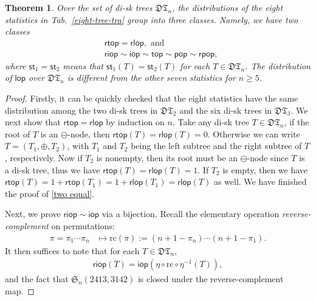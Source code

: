 \documentclass[12pt]{amsart}
\numberwithin{equation}{section}
\theoremstyle{plain}
\newtheorem{theorem}{Theorem}[section]
\theoremstyle{definition}
\def\S{\mathfrak{S}}
\def\st{\mathsf{st}}
\def\rc{\mathrm{rc}}
\newcommand{\DT}{\mathfrak{DT}}
\def\iop{\mathsf{iop}}
\def\top{\mathsf{top}}
\def\riop{\mathsf{riop}}
\def\rtop{\mathsf{rtop}}
\def\pop{\mathsf{pop}}
\def\lop{\mathsf{lop}}
\def\rpop{\mathsf{rpop}}
\def\rlop{\mathsf{rlop}}
\begin{document}
\begin{theorem}\label{thm:transver}
Over the set of di-sk trees $\DT_n$, the distributions of the eight statistics in Tab.~\ref{eight-tree-tra} group into three classes. Namely, we have two classes
\begin{align}
&\rtop=\rlop, \text{ and}\label{two equal}\\
&\riop\sim\iop\sim\top\sim\pop\sim\rpop, \label{five equal}
\end{align}
where $\st_1=\st_2$ means that $\st_1(T)=\st_2(T)$ for each $T\in\DT_n$. The distribution of $\lop$ over $\DT_n$ is different from the other seven statistics for $n\ge 5$.
\end{theorem}
\begin{proof}
Firstly, it can be quickly checked that the eight statistics have the same distribution among the two di-sk trees in $\DT_2$ and the six di-sk trees in $\DT_3$. We next show that $\rtop=\rlop$ by induction on $n$. Take any di-sk tree $T\in\DT_n$, if the root of $T$ is an $\ominus$-node, then $\rtop(T)=\rlop(T)=0$. Otherwise we can write $T=(T_1,\oplus,T_2)$, with $T_1$ and $T_2$ being the left subtree and the right subtree of $T$, respectively. Now if $T_2$ is nonempty, then its root must be an $\ominus$-node since $T$ is a di-sk tree, thus we have $\rtop(T)=\rlop(T)=1$. If $T_2$ is empty, then we have
$\rtop(T)=1+\rtop(T_1)=1+\rlop(T_1)=\rlop(T)$ as well. We have finished the proof of \eqref{two equal}.

Next, we prove $\riop\sim\iop$ via a bijection. Recall the elementary operation {\em reverse-complement} on permutations:
\begin{align*}
\pi=\pi_1\cdots\pi_n &\mapsto \rc(\pi):=(n+1-\pi_n)\cdots (n+1-\pi_1).
\end{align*}
It then suffices to note that for each $T\in\DT_n$,
\begin{align*}
\riop(T)=\iop(\eta\circ\rc\circ\eta^{-1}(T)),
\end{align*}
and the fact that $\S_n(2413,3142)$ is closed under the reverse-complement map.


\end{proof}
\end{document}
